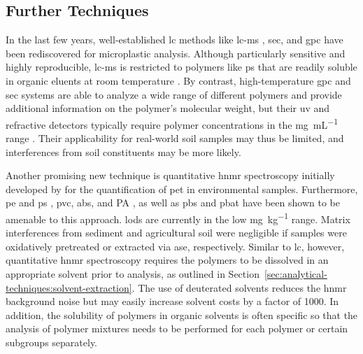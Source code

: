 \subsection{Further Techniques}
\label{sec:analytical-techniques:further-techniques}

In the last few years, well-established \ac{lc}
methods like \ac{lc-ms} \citep{SchirinziTrace2019}, \ac{sec}, and \ac{gpc} \citep{ElertComparison2017} have been rediscovered for microplastic analysis. Although particularly sensitive and highly reproducible, \ac{lc-ms} is restricted to polymers like \ac{ps} that are readily soluble in organic eluents at room temperature \citep{SchirinziTrace2019}. By contrast, high-temperature \ac{gpc} and \ac{sec} systems are able to analyze a wide range of different polymers and provide additional information on the polymer's molecular weight, but their \ac{uv} and refractive detectors typically require polymer concentrations in the \si{\milli\gram\per\milli\liter} range \citep{ElertComparison2017}. Their applicability for real-world soil samples may thus be limited, and interferences from soil constituents may be more likely.

Another promising new technique is quantitative \ac{hnmr} spectroscopy initially developed by \citet{PeezQuantitative2019} for the quantification of \ac{pet} in environmental samples. Furthermore, \ac{pe} and \ac{ps} \citep{PeezFirst2019}, \ac{pvc}, \ac{abs}, and PA \citep{PeezQuantitative2020}, as well as \ac{pbs} and \ac{pbat} \citep{NelsonQuantification2019} have been shown to be amenable to this approach. \Acp{lod} are currently in the low \si{\milli\gram\per\kilo\gram} range. Matrix interferences from sediment \citep{PeezQuantitative2019} and agricultural soil \citep{NelsonQuantification2019} were negligible if samples were oxidatively pretreated or extracted via \ac{ase}, respectively. Similar to \ac{lc}, however,
quantitative \ac{hnmr} spectroscopy requires the polymers to be dissolved in an appropriate solvent prior to analysis, as outlined in Section~\ref{sec:analytical-techniques:solvent-extraction}. The use of deuterated solvents reduces the \ac{hnmr} background noise but may easily increase solvent costs by a factor of 1000. In addition, the solubility of polymers in organic solvents is often specific so that the analysis of polymer mixtures needs to be performed for each polymer or certain subgroups separately.

